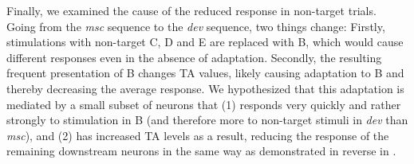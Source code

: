 \documentclass[9pt,lineno,onehalfspacing]{elife}
\newcommand{\dev}{\textit{dev}}
\newcommand{\msc}{\textit{msc}}
\begin{document}
Finally, we examined the cause of the reduced response in non-target trials. Going from the \msc{} sequence to the \dev{} sequence, two things change: Firstly, stimulations with non-target C, D and E are replaced with B, which would cause different responses even in the absence of adaptation. Secondly, the resulting  frequent presentation of B changes TA values, likely causing adaptation to B and thereby decreasing the average response. We hypothesized that this adaptation is mediated by a small subset of neurons that (1) responds very quickly and rather strongly to stimulation in B (and therefore more to non-target stimuli in \dev{} than \msc{}), and (2) has increased TA levels as a result, reducing the response of the remaining downstream neurons in the same way as demonstrated in reverse in .
\end{document}
